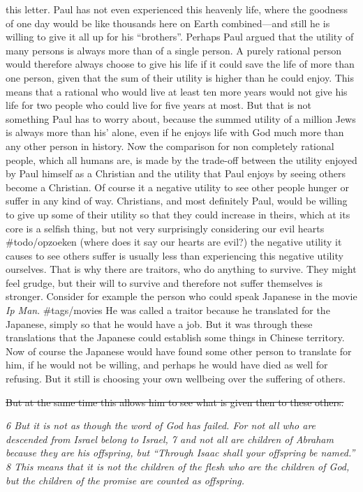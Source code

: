 this letter. Paul has not even experienced this heavenly life, where the
goodness of one day would be like thousands here on Earth combined---and
still he is willing to give it all up for his ``brothers''. Perhaps Paul
argued that the utility of many persons is always more than of a single
person. A purely rational person would therefore always choose to give
his life if it could save the life of more than one person, given that
the sum of their utility is higher than he could enjoy. This means that
a rational who would live at least ten more years would not give his
life for two people who could live for five years at most. But that is
not something Paul has to worry about, because the summed utility of a
million Jews is always more than his' alone, even if he enjoys life with
God much more than any other person in history. Now the comparison for
non completely rational people, which all humans are, is made by the
trade-off between the utility enjoyed by Paul himself as a Christian and
the utility that Paul enjoys by seeing others become a Christian. Of
course it a negative utility to see other people hunger or suffer in any
kind of way. Christians, and most definitely Paul, would be willing to
give up some of their utility so that they could increase in theirs,
which at its core is a selfish thing, but not very surprisingly
considering our evil hearts \#todo/opzoeken (where does it say our
hearts are evil?) the negative utility it causes to see others suffer is
usually less than experiencing this negative utility ourselves. That is
why there are traitors, who do anything to survive. They might feel
grudge, but their will to survive and therefore not suffer themselves is
stronger. Consider for example the person who could speak Japanese in
the movie \emph{Ip Man}. \#tags/movies He was called a traitor because
he translated for the Japanese, simply so that he would have a job. But
it was through these translations that the Japanese could establish some
things in Chinese territory. Now of course the Japanese would have found
some other person to translate for him, if he would not be willing, and
perhaps he would have died as well for refusing. But it still is
choosing your own wellbeing over the suffering of others.

\sout{But at the same time this allows him to see what is given then to
these others.}

\emph{6 But it is not as though the word of God has failed. For not all
who are descended from Israel belong to Israel, 7 and not all are
children of Abraham because they are his offspring, but ``Through Isaac
shall your offspring be named.'' 8 This means that it is not the
children of the flesh who are the children of God, but the children of
the promise are counted as offspring.}

